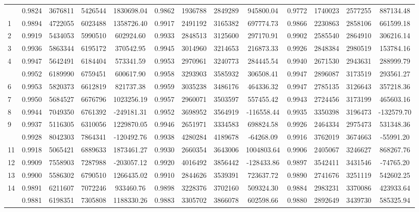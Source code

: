 \documentclass[
  12pt,
]{article}
\begin{document}
\begin{longtable}[t]{lcccccccccccc}
\endfoot
\bottomrule
\endlastfoot
0 & 0.9824 & 3676811 & 5426544 & 1830698.04 & 0.9862 & 1936788 & 2849289 & 945800.04 & 0.9772 & 1740023 & 2577255 & 887134.48\\
1 & 0.9894 & 4722055 & 6023488 & 1358726.40 & 0.9917 & 2491192 & 3165382 & 697774.73 & 0.9866 & 2230863 & 2858106 & 661599.18\\
2 & 0.9919 & 5434053 & 5990510 & 602924.60 & 0.9933 & 2848513 & 3125600 & 297170.91 & 0.9902 & 2585540 & 2864910 & 306216.14\\
3 & 0.9936 & 5863344 & 6195172 & 370542.95 & 0.9945 & 3014960 & 3214653 & 216873.33 & 0.9926 & 2848384 & 2980519 & 153784.16\\
4 & 0.9947 & 5642491 & 6184404 & 573341.59 & 0.9953 & 2970961 & 3240773 & 284445.54 & 0.9940 & 2671530 & 2943631 & 288999.79\\
\addlinespace
5 & 0.9952 & 6189990 & 6759451 & 600617.90 & 0.9958 & 3293903 & 3585932 & 306508.41 & 0.9947 & 2896087 & 3173519 & 293561.27\\
6 & 0.9953 & 5820373 & 6612819 & 821737.38 & 0.9959 & 3035238 & 3486176 & 464336.32 & 0.9947 & 2785135 & 3126643 & 357218.36\\
7 & 0.9950 & 5684527 & 6676796 & 1023256.19 & 0.9957 & 2960071 & 3503597 & 557455.42 & 0.9943 & 2724456 & 3173199 & 465603.16\\
8 & 0.9944 & 7049350 & 6761392 & -249181.31 & 0.9952 & 3698952 & 3564919 & -116558.44 & 0.9935 & 3350398 & 3196473 & -132579.70\\
9 & 0.9937 & 5116305 & 6310056 & 1229870.05 & 0.9946 & 2651971 & 3334583 & 698824.58 & 0.9926 & 2464334 & 2975473 & 531348.36\\
\addlinespace
10 & 0.9928 & 8042303 & 7864341 & -120492.76 & 0.9938 & 4280284 & 4189678 & -64268.09 & 0.9916 & 3762019 & 3674663 & -55991.20\\
11 & 0.9918 & 5065421 & 6889633 & 1873461.27 & 0.9930 & 2660354 & 3643006 & 1004803.64 & 0.9906 & 2405067 & 3246627 & 868267.76\\
12 & 0.9909 & 7558903 & 7287988 & -203057.12 & 0.9920 & 4016492 & 3856442 & -128433.86 & 0.9897 & 3542411 & 3431546 & -74765.20\\
13 & 0.9900 & 5586302 & 6790510 & 1266435.02 & 0.9910 & 2844626 & 3539391 & 723637.72 & 0.9890 & 2741676 & 3251119 & 542602.25\\
14 & 0.9891 & 6211607 & 7072246 & 933460.76 & 0.9898 & 3228376 & 3702160 & 509324.30 & 0.9884 & 2983231 & 3370086 & 423933.64\\
\addlinespace
15 & 0.9881 & 6198351 & 7305808 & 1188330.26 & 0.9883 & 3305702 & 3866078 & 602598.66 & 0.9880 & 2892649 & 3439730 & 585325.94\\

\end{longtable}
\end{document}

